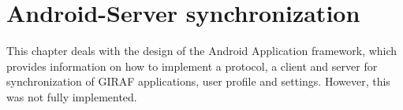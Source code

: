 \chapter{Android-Server synchronization}
\label{androidDesign}
This chapter deals with the design of the Android Application framework, which provides information on how to implement a protocol, a client and server for synchronization of GIRAF applications, user profile and settings. However, this was not fully implemented. 